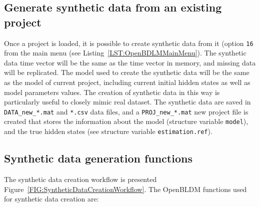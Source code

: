 \subsection{Generate synthetic data from an existing project}



Once a project is loaded, it is possible to create synthetic data from it (option \colorbox{light-gray}{\lstinline[basicstyle = \mlttfamily \small, backgroundcolor = \color{light-gray}]!16!} from the main menu (see Listing~\ref{LST:OpenBDLMMainMenu}).
The synthetic data time vector will be the same as the time vector in memory, and missing data will be replicated.
The model used to create the synthetic data will be the same as the model of current project, including current initial hidden states as well as model parameters values.
The creation of synthetic data in this way is particularly useful to closely mimic real dataset.
The synthetic data are saved in \lstinline[basicstyle = \mlttfamily \small, backgroundcolor = \color{light-gray}]!DATA_new_*.mat! and \lstinline[basicstyle = \mlttfamily \small, backgroundcolor = \color{light-gray}]!*.csv! data files, and a \lstinline[basicstyle = \mlttfamily \small, backgroundcolor = \color{light-gray}]!PROJ_new_*.mat! new project file is created that stores the information about the model (structure variable \lstinline[basicstyle = \mlttfamily \small, backgroundcolor = \color{light-gray}]!model!), and the true hidden states (see structure variable \lstinline[basicstyle = \mlttfamily \small, backgroundcolor = \color{light-gray}]!estimation.ref!).






\subsection{Synthetic data generation functions}


The synthetic data creation workflow is presented Figure~\ref{FIG:SyntheticDataCreationWorkflow}. 
The OpenBLDM functions used for synthetic data creation are:

